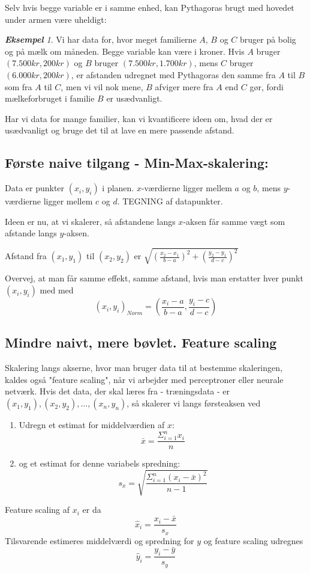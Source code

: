 \documentclass[a4paper, 12pt]{article}
\theoremstyle{remark}
\newtheorem{Eksempel}{\textbf{Eksempel}}
\begin{document}
Selv hvis begge variable er i samme enhed, kan Pythagoras brugt med hovedet under armen være uheldigt:
\begin{Eksempel}
Vi har data for, hvor meget familierne $A$, $B$ og $C$  bruger på bolig og på mælk om måneden. Begge variable kan være i kroner. Hvis $A$ bruger $(7.500 kr, 200 kr)$ og $B$ bruger $(7.500 kr, 1.700 kr)$, mens $C$ bruger $(6.000 kr, 200 kr)$, er afstanden udregnet med Pythagoras den samme fra $A$ til $B$ som fra $A$ til $C$, men vi vil nok mene, $B$ afviger mere fra $A$ end $C$ gør, fordi mælkeforbruget i familie $B$ er usædvanligt.

Har vi data for mange familier, kan vi kvantificere ideen om, hvad der er usædvanligt og bruge det til at lave en mere passende afstand. 
\end{Eksempel}

\subsection*{Første naive tilgang - Min-Max-skalering:}

Data er punkter $(x_i,y_i)$ i planen. $x$-værdierne ligger mellem $a$ og $b$, mens $y$-værdierne ligger mellem $c$ og $d$. TEGNING af datapunkter.

Ideen er nu, at vi skalerer, så afstandene langs $x$-aksen får samme vægt som afstande langs $y$-aksen. 

Afstand fra $(x_1,y_1)$ til $(x_2,y_2)$ er $\sqrt{(\frac{x_2-x_1}{b-a})^2+(\frac{y_2-y_1}{d-c})^2}$

Overvej, at man får samme effekt, samme afstand, hvis man erstatter hver punkt $(x_i,y_i)$ med med $$(x_i,y_i)_{Norm}=\left(\frac{x_i-a}{b-a}, \frac{y_i-c}{d-c}\right)$$

\subsection*{Mindre naivt, mere bøvlet. Feature scaling}
Skalering langs akserne, hvor man bruger data til at bestemme skaleringen, kaldes også "feature scaling", når vi arbejder med perceptroner eller neurale netværk. Hvis det data, der skal læres fra - træningsdata - er $(x_1,y_1), (x_2,y_2),\ldots, (x_n,y_n)$, så skalerer vi langs førsteaksen ved
\begin{enumerate}
\item Udregn et estimat for middelværdien af $x$:
$$\bar{x}=\frac{\Sigma_{i=1}^nx_i}{n}$$
\item og et estimat for denne variabels spredning:
$$s_x=\sqrt{\frac{\Sigma_{i=1}^n(x_i-\bar{x})^2}{n-1}}$$
\end{enumerate}
Feature scaling af $x_i$ er da
$$\hat{x}_i=\frac{x_i-\bar{x}}{s_x}$$
Tilsvarende estimeres middelværdi og spredning for $y$ og feature scaling udregnes 
$$\hat{y}_i= \frac{y_i-\bar{y}}{s_y}$$
\end{document}
